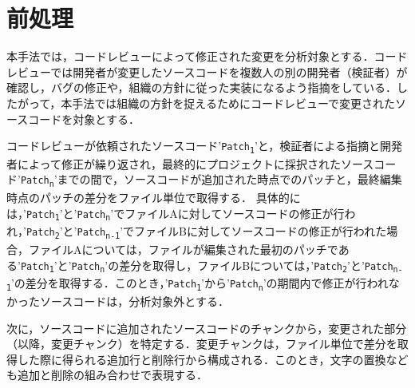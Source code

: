 \documentclass[11pt]{jreport}
\begin{document}



\section{前処理}\label{subsec: pre_process}
本手法では，コードレビューによって修正された変更を分析対象とする．コードレビューでは開発者が変更したソースコードを複数人の別の開発者（検証者）が確認し，バグの修正や，組織の方針に従った実装になるよう指摘をしている．したがって，本手法では組織の方針を捉えるためにコードレビューで変更されたソースコードを対象とする．

コードレビューが依頼されたソースコード'\texttt{Patch\textsubscript{1}}'と，検証者による指摘と開発者によって修正が繰り返され，最終的にプロジェクトに採択されたソースコード'\texttt{Patch\textsubscript{n}}'までの間で，ソースコードが追加された時点でのパッチと，最終編集時点のパッチの差分をファイル単位で取得する．
具体的には，'\texttt{Patch\textsubscript{1}}'と'\texttt{Patch\textsubscript{n}}'でファイルAに対してソースコードの修正が行われ，'\texttt{Patch\textsubscript{2}}'と'\texttt{Patch\textsubscript{n-1}}'でファイルBに対してソースコードの修正が行われた場合，ファイルAについては，ファイルが編集された最初のパッチである'\texttt{Patch\textsubscript{1}}'と'\texttt{Patch\textsubscript{n}}'の差分を取得し，ファイルBについては，'\texttt{Patch\textsubscript{2}}'と'\texttt{Patch\textsubscript{n-1}}'の差分を取得する．このとき，'\texttt{Patch\textsubscript{1}}'から'\texttt{Patch\textsubscript{n}}'の期間内で修正が行われなかったソースコードは，分析対象外とする．

次に，ソースコードに追加されたソースコードのチャンクから，変更された部分（以降，変更チャンク）を特定する．変更チャンクは，ファイル単位で差分を取得した際に得られる追加行と削除行から構成される．このとき，文字の置換なども追加と削除の組み合わせで表現する．
\end{document}
